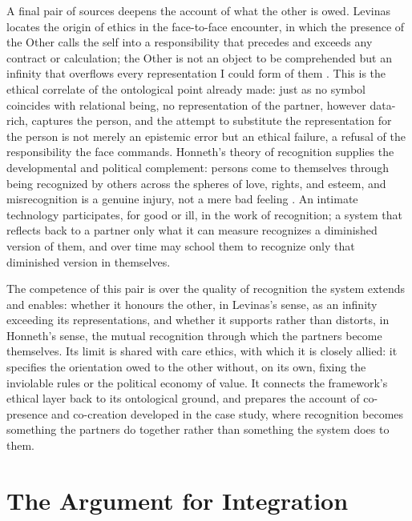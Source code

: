 \documentclass[11pt,a4paper]{article}
\begin{document}
A final pair of sources deepens the account of what the other is owed. Levinas locates the origin of ethics in the face-to-face encounter, in which the presence of the Other calls the self into a responsibility that precedes and exceeds any contract or calculation; the Other is not an object to be comprehended but an infinity that overflows every representation I could form of them \parencite{levinas1969totality}. This is the ethical correlate of the ontological point already made: just as no symbol coincides with relational being, no representation of the partner, however data-rich, captures the person, and the attempt to substitute the representation for the person is not merely an epistemic error but an ethical failure, a refusal of the responsibility the face commands. Honneth's theory of recognition supplies the developmental and political complement: persons come to themselves through being recognized by others across the spheres of love, rights, and esteem, and misrecognition is a genuine injury, not a mere bad feeling \parencite{honneth1995struggle}. An intimate technology participates, for good or ill, in the work of recognition; a system that reflects back to a partner only what it can measure recognizes a diminished version of them, and over time may school them to recognize only that diminished version in themselves.

The competence of this pair is over the quality of recognition the system extends and enables: whether it honours the other, in Levinas's sense, as an infinity exceeding its representations, and whether it supports rather than distorts, in Honneth's sense, the mutual recognition through which the partners become themselves. Its limit is shared with care ethics, with which it is closely allied: it specifies the orientation owed to the other without, on its own, fixing the inviolable rules or the political economy of value. It connects the framework's ethical layer back to its ontological ground, and prepares the account of co-presence and co-creation developed in the case study, where recognition becomes something the partners do together rather than something the system does to them.

\section{The Argument for Integration}\label{p01:sec:integration-argument}
\end{document}
